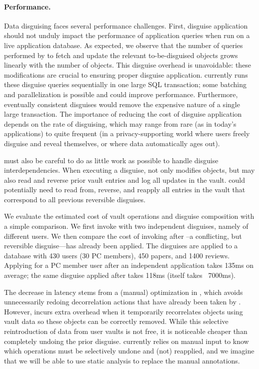 \paragraph{Performance.}
\label{sec:perf}

Data disguising faces several performance challenges.
%
First, disguise application should not unduly impact the performance of application queries
when run on a live application database.
As expected, we observe that the number of queries performed by \sys to fetch and update the relevant
to-be-disguised objects grows linearly with the number of objects. This disguise overhead is
unavoidable: these modifications are crucial to ensuring proper disguise application.
\sys currently runs these disguise queries sequentially in one large SQL transaction; some batching and parallelization is possible and could improve performance.
%
Furthermore, eventually consistent disguises would remove the expensive nature of a single large
transaction. The importance of reducing the cost of disguise application depends on the rate of
disguising, which may range from rare (as in today's applications) to quite frequent (in a
privacy-supporting world where users freely disguise and reveal themselves, or where data
automatically ages out).

%
\sys must also be careful to do as little work as possible to handle disguise interdependencies.
When executing a disguise, \sys not only modifies objects, but may also read and reverse prior
vault entries and log all updates in the vault.
%
\sys could potentially need to read from, reverse, and reapply all entries in the vault that correspond
to all previous reversible disguises.

We evaluate the estimated cost of vault operations and disguise composition with a simple
comparison. We first invoke \sys with two independent disguises, namely \hrtbf of different
users. We then compare the cost of invoking \hrtbf after \hconfanon--a conflicting, but reversible
disguise---has already been applied.
The disguises are applied to a database with 430 users (30 PC members), 450 papers, and 1400
reviews.
Applying \hrtbf for a PC member user after an independent \hrtbf application takes 135ms on average;
the same \hrtbf disguise applied after \hconfanon takes 118ms (\hconfanon itself takes
   ~7000ms). 

The decrease in latency stems from a (manual) optimization in \sys, which avoids unnecessarily
redoing decorrelation actions that have already been taken by \hconfanon.  However, \sys incurs
extra overhead when it temporarily recorrelates objects using vault data so these objects can be
correctly removed. While this selective reintroduction of data from user vaults is not free, it
is noticeable cheaper than completely undoing the prior \hconfanon disguise.
\sys currently relies on manual input to know which operations must be selectively undone and (not)
reapplied, and we imagine that we will be able to use static analysis to replace the manual
annotations.
